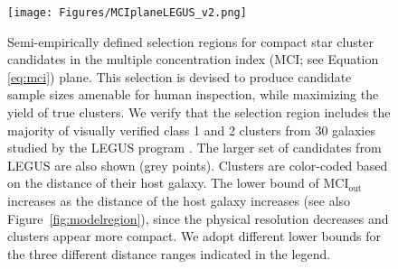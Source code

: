 \begin{figure}
\centering
\texttt{[image: Figures/MCIplaneLEGUS\_v2.png]}
\caption{Semi-empirically defined selection regions for compact star cluster candidates in the multiple concentration index (MCI; see Equation \ref{eq:mci}) plane.  This selection is devised to produce candidate sample sizes amenable for human inspection, while maximizing the yield of true clusters. We verify that the selection region includes the majority of visually verified class 1 and 2 clusters from 30 galaxies studied by the LEGUS program \citep[][colored points; \url{https://archive.stsci.edu/prepds/legus/dataproducts-public.html}]{calzetti15, adamo17}.  The larger set of candidates from LEGUS are also shown (grey points).  Clusters are color-coded based on the distance of their host galaxy.  The lower bound of MCI$_\mathrm{out}$ increases as the distance of the host galaxy increases (see also Figure~\ref{fig:modelregion}), since the physical resolution decreases and clusters appear more compact.  We adopt different lower bounds for the three different distance ranges indicated in the legend.}
 \label{fig:empiricalregion}
\end{figure}